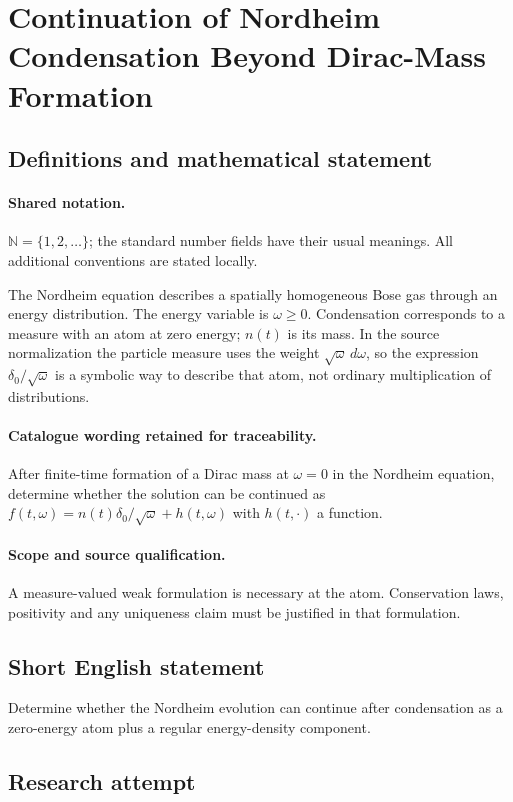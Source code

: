 \documentclass[11pt]{article}
\begin{document}
\section{Continuation of Nordheim Condensation Beyond Dirac-Mass Formation}\label{statement}

\subsection{Definitions and mathematical statement}

\paragraph{Shared notation.}$\mathbb N=\{1,2,\ldots\}$; the standard number fields have their usual meanings. All additional conventions are stated locally.


The Nordheim equation describes a spatially homogeneous Bose gas through an energy distribution. The energy variable is $\omega\geq0$. Condensation corresponds to a measure with an atom at zero energy; $n(t)$ is its mass. In the source normalization the particle measure uses the weight $\sqrt\omega\,d\omega$, so the expression $\delta_0/\sqrt\omega$ is a symbolic way to describe that atom, not ordinary multiplication of distributions.

\paragraph{Catalogue wording retained for traceability.}
After finite-time formation of a Dirac mass at $\omega=0$ in the Nordheim equation, determine whether the solution can be continued as $f(t,\omega)=n(t)\delta_0/\sqrt\omega+h(t,\omega)$ with $h(t,\cdot)$ a function.

\paragraph{Scope and source qualification.}A measure-valued weak formulation is necessary at the atom. Conservation laws, positivity and any uniqueness claim must be justified in that formulation.
\subsection{Short English statement}
Determine whether the Nordheim evolution can continue after condensation as a zero-energy atom plus a regular energy-density component.
\subsection{Research attempt}
\end{document}
